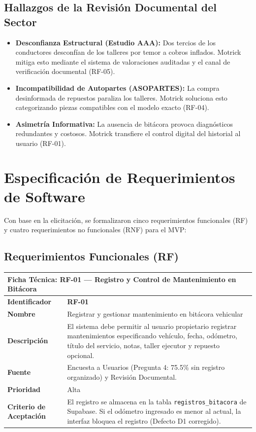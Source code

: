 \documentclass[11pt,letterpaper]{article}
\begin{document}
\subsection{Hallazgos de la Revisión Documental del Sector}
\begin{itemize}
    \item \textbf{Desconfianza Estructural (Estudio AAA):} Dos tercios de los conductores desconfían de los talleres por temor a cobros inflados. Motrick mitiga esto mediante el sistema de valoraciones auditadas y el canal de verificación documental (RF-05).
    \item \textbf{Incompatibilidad de Autopartes (ASOPARTES):} La compra desinformada de repuestos paraliza los talleres. Motrick soluciona esto categorizando piezas compatibles con el modelo exacto (RF-04).
    \item \textbf{Asimetría Informativa:} La ausencia de bitácora provoca diagnósticos redundantes y costosos. Motrick transfiere el control digital del historial al usuario (RF-01).
\end{itemize}

\newpage

\section{Especificación de Requerimientos de Software}

Con base en la elicitación, se formalizaron cinco requerimientos funcionales (RF) y cuatro requerimientos no funcionales (RNF) para el MVP:

\subsection{Requerimientos Funcionales (RF)}

\begin{table}[h!]
\centering
\small
\begin{tabularx}{\textwidth}{p{3.5cm}X}
\toprule
\multicolumn{2}{l}{\textbf{\color{darkblue}Ficha Técnica: RF-01 — Registro y Control de Mantenimiento en Bitácora}} \\
\midrule
\textbf{Identificador} & \textbf{RF-01} \\
\textbf{Nombre} & Registrar y gestionar mantenimiento en bitácora vehicular \\
\textbf{Descripción} & El sistema debe permitir al usuario propietario registrar mantenimientos especificando vehículo, fecha, odómetro, título del servicio, notas, taller ejecutor y repuesto opcional. \\
\textbf{Fuente} & Encuesta a Usuarios (Pregunta 4: 75.5\% sin registro organizado) y Revisión Documental. \\
\textbf{Prioridad} & Alta \\
\textbf{Criterio de Aceptación} & El registro se almacena en la tabla \texttt{registros\_bitacora} de Supabase. Si el odómetro ingresado es menor al actual, la interfaz bloquea el registro (Defecto D1 corregido). \\
\bottomrule
\end{tabularx}
\end{table}
\end{document}
